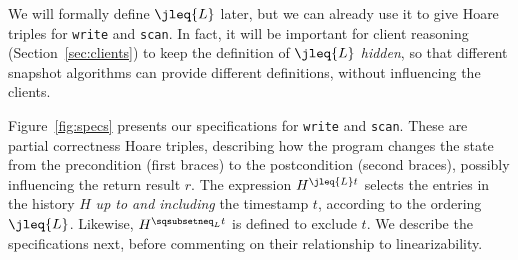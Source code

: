 We will formally define $\jleq{\ordlist}$ later, but we can already use it to
give Hoare triples for {\tt write} and {\tt scan}. In fact, it will be
important for client reasoning (Section~\ref{sec:clients}) to keep the
definition of $\jleq{\ordlist}$ \emph{hidden}, so that different snapshot
algorithms can provide different definitions, without influencing the
clients.
%

%
Figure~\ref{fig:specs} presents our specifications for {\tt write} and
{\tt scan}. These are partial correctness Hoare triples, describing
how the program changes the state from the precondition (first braces)
to the postcondition (second braces), possibly influencing the return
result $r$. %
%
The expression $H^{\hbox{}\jleq{\ordlist} t}$ selects the entries in the history
$H$ \emph{up to and including} the timestamp $t$, according to the
ordering $\jleq{\ordlist}$. Likewise, $H^{\hbox{}\sqsubsetneq_\ordlist t}$ is
defined to exclude $t$.
%
We describe the specifications next, before commenting on their
relationship to linearizability.

